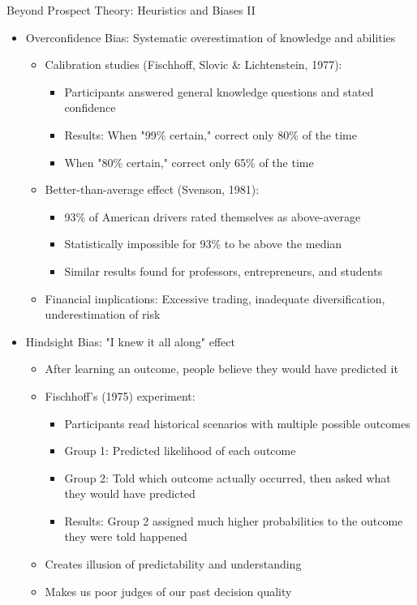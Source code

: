 \documentclass[10pt,handout]{beamer}
\begin{document}
\begin{frame}{Beyond Prospect Theory: Heuristics and Biases II}
  \begin{itemize}[<+->]
    \item Overconfidence Bias: Systematic overestimation of knowledge and abilities
      \begin{itemize}
        \item Calibration studies (Fischhoff, Slovic \& Lichtenstein, 1977):
          \begin{itemize}
            \item Participants answered general knowledge questions and stated confidence
            \item Results: When "99\% certain," correct only 80\% of the time
            \item When "80\% certain," correct only 65\% of the time
          \end{itemize}
        \item Better-than-average effect (Svenson, 1981):
          \begin{itemize}
            \item 93\% of American drivers rated themselves as above-average
            \item Statistically impossible for 93\% to be above the median
            \item Similar results found for professors, entrepreneurs, and students
          \end{itemize}
        \item Financial implications: Excessive trading, inadequate diversification, underestimation of risk
      \end{itemize}
    \item Hindsight Bias: "I knew it all along" effect
      \begin{itemize}
        \item After learning an outcome, people believe they would have predicted it
        \item Fischhoff's (1975) experiment:
          \begin{itemize}
            \item Participants read historical scenarios with multiple possible outcomes
            \item Group 1: Predicted likelihood of each outcome
            \item Group 2: Told which outcome actually occurred, then asked what they would have predicted
            \item Results: Group 2 assigned much higher probabilities to the outcome they were told happened
          \end{itemize}
        \item Creates illusion of predictability and understanding
        \item Makes us poor judges of our past decision quality
      \end{itemize}
  \end{itemize}
\end{frame}
\end{document}
